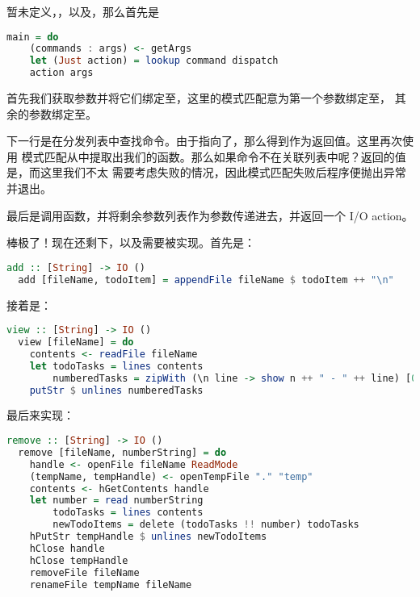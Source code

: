 \documentclass[./main.tex]{subfiles}
\begin{document}
暂未定义，，以及，那么首先是

\begin{lstlisting}[language=Haskell]
  main = do
    (commands : args) <- getArgs
    let (Just action) = lookup command dispatch
    action args
\end{lstlisting}

首先我们获取参数并将它们绑定至，这里的模式匹配意为第一个参数绑定至，
其余的参数绑定至。

下一行是在分发列表中查找命令。由于指向了，那么得到作为返回值。这里再次使用
模式匹配从中提取出我们的函数。那么如果命令不在关联列表中呢？返回的值是，而这里我们不太
需要考虑失败的情况，因此模式匹配失败后程序便抛出异常并退出。

最后是调用函数，并将剩余参数列表作为参数传递进去，并返回一个 I/O action。

棒极了！现在还剩下，以及需要被实现。首先是：

\begin{lstlisting}[language=Haskell]
  add :: [String] -> IO ()
  add [fileName, todoItem] = appendFile fileName $ todoItem ++ "\n"
\end{lstlisting}

接着是：

\begin{lstlisting}[language=Haskell]
  view :: [String] -> IO ()
  view [fileName] = do
    contents <- readFile fileName
    let todoTasks = lines contents
        numberedTasks = zipWith (\n line -> show n ++ " - " ++ line) [0 ..] todoTasks
    putStr $ unlines numberedTasks
\end{lstlisting}

最后来实现：

\begin{lstlisting}[language=Haskell]
  remove :: [String] -> IO ()
  remove [fileName, numberString] = do
    handle <- openFile fileName ReadMode
    (tempName, tempHandle) <- openTempFile "." "temp"
    contents <- hGetContents handle
    let number = read numberString
        todoTasks = lines contents
        newTodoItems = delete (todoTasks !! number) todoTasks
    hPutStr tempHandle $ unlines newTodoItems
    hClose handle
    hClose tempHandle
    removeFile fileName
    renameFile tempName fileName
\end{lstlisting}
\end{document}
